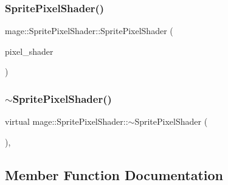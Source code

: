 \hypertarget{classmage_1_1_sprite_pixel_shader_a2ec1a47d5ada6e2e319605108f971d0c}{}\label{classmage_1_1_sprite_pixel_shader_a2ec1a47d5ada6e2e319605108f971d0c} 
\subsubsection{\texorpdfstring{Sprite\+Pixel\+Shader()}{SpritePixelShader()}\hspace{0.1cm}{\footnotesize\ttfamily [3/3]}}
{\footnotesize\ttfamily mage\+::\+Sprite\+Pixel\+Shader\+::\+Sprite\+Pixel\+Shader (\begin{DoxyParamCaption}\item[{\hyperlink{classmage_1_1_sprite_pixel_shader}{Sprite\+Pixel\+Shader} \&\&}]{pixel\+\_\+shader }\end{DoxyParamCaption})\hspace{0.3cm}{\ttfamily [default]}}

\hypertarget{classmage_1_1_sprite_pixel_shader_af7d6fd20a491855f8dfd2aef5e6294c4}{}\label{classmage_1_1_sprite_pixel_shader_af7d6fd20a491855f8dfd2aef5e6294c4} 
\subsubsection{\texorpdfstring{$\sim$\+Sprite\+Pixel\+Shader()}{~SpritePixelShader()}}
{\footnotesize\ttfamily virtual mage\+::\+Sprite\+Pixel\+Shader\+::$\sim$\+Sprite\+Pixel\+Shader (\begin{DoxyParamCaption}{ }\end{DoxyParamCaption})\hspace{0.3cm}{\ttfamily [virtual]}, {\ttfamily [default]}}



\subsection{Member Function Documentation}
\hypertarget{classmage_1_1_sprite_pixel_shader_a546d7d1b50872450577db0fff8b05151}{}\label{classmage_1_1_sprite_pixel_shader_a546d7d1b50872450577db0fff8b05151} 

